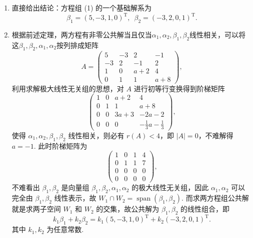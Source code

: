 \documentclass[UTF8,12pt,a4paper,fontset=fandol]{ctexart}
\begin{document}
\begin{solve}
\begin{enumerate}
        \item 直接给出结论：方程组 (1) 的一个基础解系为
              \[\beta_1=(5,-3,1,0)^{\mathrm{T}},\enspace\beta_2=(-3,2,0,1)^{\mathrm{T}}.\]

        \item 根据前述定理，两方程有非零公共解当且仅当$\alpha_1,\alpha_2,\beta_1,\beta_2$线性相关，可以将这$\beta_1,\beta_2,\alpha_1,\alpha_2$按列排成矩阵
              \[A = \begin{pmatrix}
                      5 & -3 & 2 & -1 \\ -3 & 2 & -1 & 2 \\ 1 & 0 & a+2 & 4 \\ 0 & 1 & 1 & a+8
                  \end{pmatrix},\]
              利用求解极大线性无关组的思想，对 $A$ 进行初等行变换得到阶梯矩阵
              \[\begin{pmatrix}
                      1 & 0 & a+2 & 4 \\ 0 & 1 & 1 & a+8 \\ 0 & 0 & 3a+3 & -2a-2 \\ 0 & 0 & 0 & -\frac{1}{3}a-\frac{1}{3}
                  \end{pmatrix},\]
              使得 $\alpha_1,\alpha_2,\beta_1,\beta_2$ 线性相关，则必有 $r(A) < 4$，即 $|A| = 0$，不难解得 $a = -1$. 此时阶梯矩阵为
              \[\begin{pmatrix}
                      1 & 0 & 1 & 4 \\ 0 & 1 & 1 & 7 \\ 0 & 0 & 0 & 0 \\ 0 & 0 & 0 & 0
                  \end{pmatrix},\]
              不难看出 $\beta_1,\beta_2$ 是向量组 $\beta_1,\beta_2,\alpha_1,\alpha_2$ 的极大线性无关组，因此 $\alpha_1,\alpha_2$ 可以完全由 $\beta_1,\beta_2$ 线性表示，故 $W_1 \cap W_2 = \operatorname{span}(\beta_1,\beta_2)$. 而求两方程组公共解就是求两子空间 $W_1$ 和 $W_2$ 的交集，故公共解为 $\beta_1,\beta_2$ 的线性组合，即
              \[k_1\beta_1 + k_2\beta_2 = k_1(5,-3,1,0)^{\mathrm{T}} + k_2(-3,2,0,1)^{\mathrm{T}}.\]
              其中 $k_1,k_2$ 为任意常数.
    \end{enumerate}
\end{solve}
\end{document}
